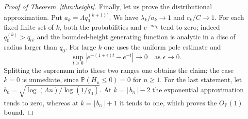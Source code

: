 \documentclass[11pt,reqno]{amsart}
\numberwithin{equation}{section}
\theoremstyle{remark}
\begin{document}
\begin{proof}[Proof of Theorem~\ref{thm:height}]
Finally, let us prove the distributional approximation. Put $a_k=\Lambda q_0^{(k+1)^2}$.
We have $\lambda_k/a_k\to1$ and $c_k/C\to1$. For each fixed finite set of $k$, both the
probabilities and $e^{-na_k}$ tend to zero; indeed $q^{(k)}_0>q_0$, and the
bounded-height generating function is analytic in a disc of radius larger than $q_0$. For
large $k$ one uses the uniform pole estimate and
\[
\sup_{t\ge0}|e^{-(1+\epsilon)t}-e^{-t}|\longrightarrow0
\quad\text{as }\epsilon\to0.
\]
Splitting the supremum into these two ranges one obtains the claim; the case $k=0$ is
immediate, since $\mathbb P(H_n\le0)=0$ for $n\ge1$. For the last statement, let
$b_n=\sqrt{\log(\Lambda n)/\log(1/q_0)}$. At $k=\lfloor b_n\rfloor-2$ the exponential
approximation tends to zero, whereas at $k=\lfloor b_n\rfloor+1$ it tends to one, which
proves the $O_{\mathbb P}(1)$ bound.
\end{proof}
\end{document}
